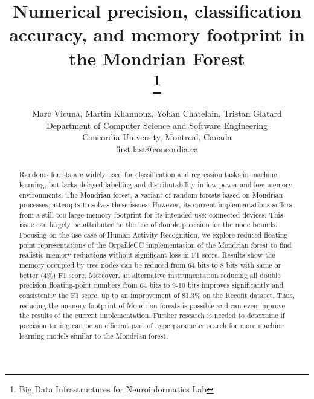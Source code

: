 \documentclass[conference]{IEEEtran}
\newcommand{\Yohan}[1]{\todo[inline,backgroundcolor=green]{YC: #1}}
\begin{document}
\title{Numerical precision, classification accuracy, and memory footprint in the
    Mondrian Forest\\
    \thanks{Big Data Infrastructures for Neuroinformatics Lab}
}

\author{Marc Vicuna, Martin Khannouz, Yohan Chatelain, Tristan Glatard\\
    Department of Computer Science and Software Engineering\\
    Concordia University, Montreal, Canada\\
    first.last@concordia.ca}


\maketitle

\begin{abstract}
    Randoms forests are widely used for classification and regression tasks in
    machine learning, but lacks delayed labelling and distributability in low
    power and low memory environments. The Mondrian forest, a variant of random
    forests based on Mondrian processes, attempts to solves these issues.
    However, its current implementations suffers from a still too large memory
    footprint for its intended use: connected devices.  This issue can largely
    be attributed to the use of double precision for the node bounds.  Focusing
    on the use case of Human Activity Recognition, we explore reduced
    floating-point representations of the OrpailleCC implementation of the
    Mondrian forest to find realistic memory reductions without significant loss
    in F1 score. Results show the memory occupied by tree nodes can be reduced
    from 64 bits to 8 bits with same or better (4\%) F1 score. Moreover, an
    alternative instrumentation reducing all double precision floating-point
    numbers from 64 bits to 9-10 bits improves significantly and consistently
    the F1 score, up to an \Yohan{is it true? Wasn't it due to a bug?}
    improvement of 81.3\% on the Recofit dataset. Thus, reducing the memory
    footprint of Mondrian forests is possible and can even improve the results
    of the current implementation. Further research is needed to determine if
    precision tuning can be an efficient part of hyperparameter search for more
    machine learning models similar to the Mondrian forest.
\end{abstract}
\end{document}
